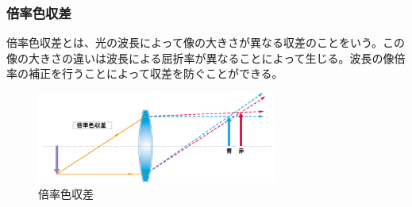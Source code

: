 \subsubsection{倍率色収差}
倍率色収差とは、光の波長によって像の大きさが異なる収差のことをいう。この像の大きさの違いは波長による屈折率が異なることによって生じる。波長の像倍率の補正を行うことによって収差を防ぐことができる。
\begin{figure}[h]
	\centering
	\includegraphics[height=30mm]{image/bairitsu.png.eps}
	\caption{倍率色収差\ \cite{cite1}}
	\label{caption1}
\end{figure}